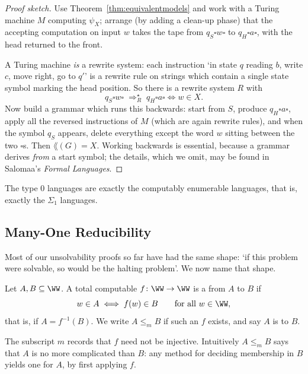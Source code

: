 \begin{proof}[Proof sketch]
	Use Theorem~\ref{thm:equivalentmodels} and work with a Turing machine $M$ computing $\psi_X$; arrange (by adding a clean-up phase) that the accepting computation on input $w$ takes the tape from $q_S\bm\square w\bm\square$ to $q_H\bm\square a\bm\square$, with the head returned to the front.

	A Turing machine \emph{is} a rewrite system: each instruction `in state $q$ reading $b$, write $c$, move right, go to $q'$' is a rewrite rule on strings which contain a single state symbol marking the head position. So there is a rewrite system $R$ with
	$$q_S\bm\square w\bm\square \;\Rightarrow_R^\star\; q_H\bm\square a\bm\square \iff w \in X.$$
	Now build a grammar which runs this backwards: start from $S$, produce $q_H \bm\square a \bm\square$, apply all the reversed instructions of $M$ (which are again rewrite rules), and when the symbol $q_S$ appears, delete everything except the word $w$ sitting between the two $\bm\square$s. Then $\lang(G) = X$. Working backwards is essential, because a grammar derives \emph{from} a start symbol; the details, which we omit, may be found in Salomaa's \emph{Formal Languages}.
\end{proof}

\begin{corollary}
	The type $0$ languages are exactly the computably enumerable languages, that is, exactly the $\Sigma_1$ languages.
\end{corollary}

\subsection{Many-One Reducibility}

Most of our unsolvability proofs so far have had the same shape: `if this problem were solvable, so would be the halting problem'. We now name that shape.

\begin{definition}[Reduction]
	Let $A, B \subseteq \WW$. A total computable $f \colon \WW\to\WW$ is a  from $A$ to $B$ if
	$$w \in A \iff f(w) \in B \qquad \text{for all } w \in \WW,$$
	that is, if $A = f^{-1}(B)$. We write $A \leq_m B$ if such an $f$ exists, and say $A$ is  to $B$.
\end{definition}

The subscript $m$ records that $f$ need not be injective. Intuitively $A \leq_m B$ says that $A$ is no more complicated than $B$: any method for deciding membership in $B$ yields one for $A$, by first applying $f$.

